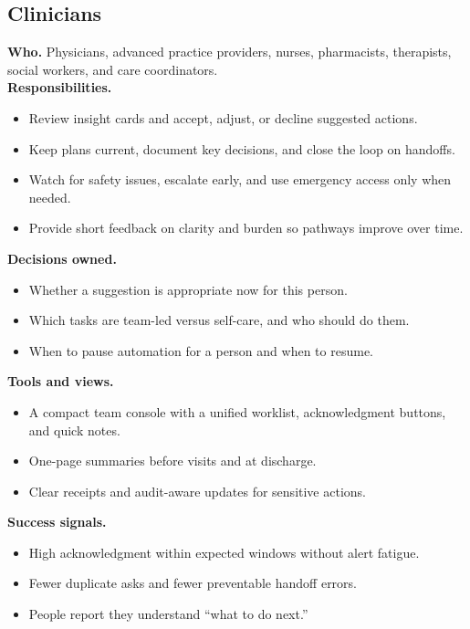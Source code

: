 \documentclass[12pt]{article}
\begin{document}
\subsection*{Clinicians}
\textbf{Who.} Physicians, advanced practice providers, nurses, pharmacists, therapists, social workers, and care coordinators.\\
\textbf{Responsibilities.}
\begin{itemize}[leftmargin=*]
  \item Review insight cards and accept, adjust, or decline suggested actions.
  \item Keep plans current, document key decisions, and close the loop on handoffs.
  \item Watch for safety issues, escalate early, and use emergency access only when needed.
  \item Provide short feedback on clarity and burden so pathways improve over time.
\end{itemize}
\textbf{Decisions owned.}
\begin{itemize}[leftmargin=*]
  \item Whether a suggestion is appropriate now for this person.
  \item Which tasks are team-led versus self-care, and who should do them.
  \item When to pause automation for a person and when to resume.
\end{itemize}
\textbf{Tools and views.}
\begin{itemize}[leftmargin=*]
  \item A compact team console with a unified worklist, acknowledgment buttons, and quick notes.
  \item One-page summaries before visits and at discharge.
  \item Clear receipts and audit-aware updates for sensitive actions.
\end{itemize}
\textbf{Success signals.}
\begin{itemize}[leftmargin=*]
  \item High acknowledgment within expected windows without alert fatigue.
  \item Fewer duplicate asks and fewer preventable handoff errors.
  \item People report they understand “what to do next.”
\end{itemize}
\end{document}
